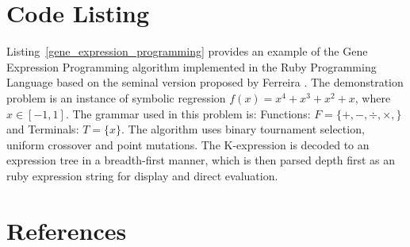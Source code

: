 \documentclass[a4paper, 11pt]{article}
\begin{document}
\section{Code Listing}
\label{sec:code}
Listing~\ref{gene_expression_programming} provides an example of the Gene Expression Programming algorithm implemented in the Ruby Programming Language based on the seminal version proposed by Ferreira \cite{Ferreira2001}.
The demonstration problem is an instance of symbolic regression $f(x)=x^4+x^3+x^2+x$, where $x\in[-1,1]$. The grammar used in this problem is: Functions: $F=\{+,-,\div,\times,\}$ and Terminals: $T=\{x\}$.
The algorithm uses binary tournament selection, uniform crossover and point mutations. The K-expression is decoded to an expression tree in a breadth-first manner, which is then parsed depth first as an ruby expression string for display and direct evaluation.




\section{References}
\label{sec:references}
\end{document}
